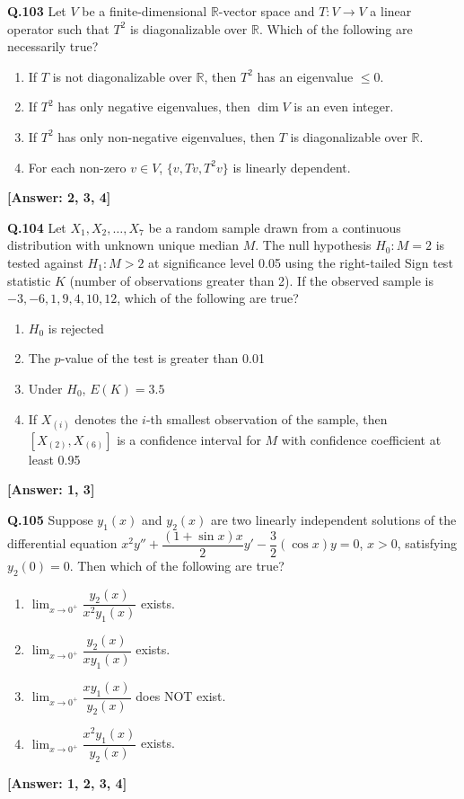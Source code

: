 \documentclass[12pt,a4paper]{article}
\newcommand{\ans}[1]{\quad\textcolor{anscolor}{\textbf{[Answer: #1]}}}
\begin{document}
\textbf{Q.103} Let $V$ be a finite-dimensional $\mathbb{R}$-vector space and $T:V\to V$ a linear operator such that $T^2$ is diagonalizable over $\mathbb{R}$. Which of the following are necessarily true?
\begin{enumerate}[label=\arabic*.]
\item If $T$ is not diagonalizable over $\mathbb{R}$, then $T^2$ has an eigenvalue $\le0$.
\item If $T^2$ has only negative eigenvalues, then $\dim V$ is an even integer.
\item If $T^2$ has only non-negative eigenvalues, then $T$ is diagonalizable over $\mathbb{R}$.
\item For each non-zero $v\in V$, $\{v,Tv,T^2v\}$ is linearly dependent.
\end{enumerate}\ans{2, 3, 4}

\textbf{Q.104} Let $X_1,X_2,\ldots,X_7$ be a random sample drawn from a continuous distribution with unknown unique median $M$. The null hypothesis $H_0:M=2$ is tested against $H_1:M>2$ at significance level 0.05 using the right-tailed Sign test statistic $K$ (number of observations greater than 2). If the observed sample is $-3,-6,1,9,4,10,12$, which of the following are true?
\begin{enumerate}[label=\arabic*.]
\item $H_0$ is rejected
\item The $p$-value of the test is greater than 0.01
\item Under $H_0$, $E(K)=3.5$
\item If $X_{(i)}$ denotes the $i$-th smallest observation of the sample, then $[X_{(2)},X_{(6)}]$ is a confidence interval for $M$ with confidence coefficient at least 0.95
\end{enumerate}\ans{1, 3}

\textbf{Q.105} Suppose $y_1(x)$ and $y_2(x)$ are two linearly independent solutions of the differential equation $x^2y''+\dfrac{(1+\sin x)x}{2}y'-\dfrac{3}{2}(\cos x)y=0$, $x>0$, satisfying $y_2(0)=0$. Then which of the following are true?
\begin{enumerate}[label=\arabic*.]
\item $\lim_{x\to0^+}\dfrac{y_2(x)}{x^2y_1(x)}$ exists.
\item $\lim_{x\to0^+}\dfrac{y_2(x)}{xy_1(x)}$ exists.
\item $\lim_{x\to0^+}\dfrac{xy_1(x)}{y_2(x)}$ does NOT exist.
\item $\lim_{x\to0^+}\dfrac{x^2y_1(x)}{y_2(x)}$ exists.
\end{enumerate}\ans{1, 2, 3, 4}
\end{document}
